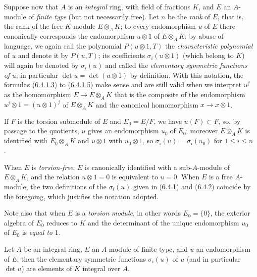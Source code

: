 \begin{env}[6.4.2]
\label{II.6.4.2}
Suppose now that $A$ is an \emph{integral} ring, with field of fractions
$K$, and $E$ an $A$-module of \emph{finite type} (but not necessarily
free). Let $n$ be the \emph{rank} of $E$, that is, the rank of the free
$K$-module $E\otimes_AK$; to every endomorphism $u$ of $E$ there canonically
corresponds the endomorphism $u\otimes1$ of $E\otimes_AK$; by abuse of
language, we again call the polynomial $P(u\otimes1,T)$ the
\emph{characteristic polynomial} of $u$ and denote it by $P(u,T)$; its
coefficients $\sigma_i(u\otimes1)$ (which belong to $K$) will again be
denoted by $\sigma_i(u)$ and called the \emph{elementary symmetric functions
of $u$}; in particular $\det u=\det(u\otimes1)$ by definition. With this
notation, the formulas (\hyperref[II.6.4.1.3]{6.4.1.3}) to
(\hyperref[II.6.4.1.5]{6.4.1.5}) make sense and are still valid when we
interpret $u^j$ as the homomorphism $E\to E\otimes_AK$ that is the composite
of the endomorphism $u^j\otimes1=(u\otimes1)^j$ of $E\otimes_AK$ and the
canonical homomorphism $x\to x\otimes1$.

If $F$ is the torsion submodule of $E$ and $E_0=E/F$, we have
$u(F)\subset F$, so, by passage to the quotients, $u$ gives an endomorphism
$u_0$ of $E_0$; moreover $E\otimes_AK$ is identified with $E_0\otimes_AK$ and
$u\otimes1$ with $u_0\otimes1$, so $\sigma_i(u)=\sigma_i(u_0)$ for
$1\leq i\leq n$.

When $E$ is \emph{torsion-free}, $E$ is canonically identified with a
sub-$A$-module of $E\otimes_AK$, and the relation $u\otimes1=0$ is
equivalent to $u=0$. When $E$ is a free $A$-module, the two definitions of
the $\sigma_i(u)$ given in (\hyperref[II.6.4.1]{6.4.1}) and
(\hyperref[II.6.4.2]{6.4.2}) coincide by the foregoing, which justifies
the notation adopted.

Note also that when $E$ is a \emph{torsion module}, in other words
$E_0=\{0\}$, the exterior algebra of $E_0$ reduces to $K$ and the
determinant of the unique endomorphism $u_0$ of $E_0$ is \emph{equal to
$1$}.
\end{env}

\begin{proposition}[6.4.3]
\label{II.6.4.3}
Let $A$ be an integral ring, $E$ an $A$-module of finite type, and $u$ an
endomorphism of $E$; then the elementary symmetric functions $\sigma_i(u)$
of $u$ (and in particular $\det u$) are elements of $K$ integral over $A$.
\end{proposition}

